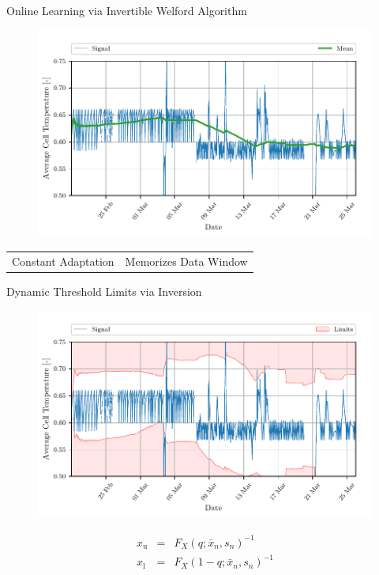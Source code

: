\documentclass[aspectratio=169]{beamer}
\newcommand{\ui}[2]{#1 _{\mathrm{#2}}}
\begin{document}
\begin{frame}{Online Learning via Invertible Welford Algorithm}
    \begin{figure}
        \begin{center}
            \includegraphics[width=0.62\linewidth]{../ilustrate/pc2023/bess/rmean_signal.pdf}
        \end{center}
    \end{figure}

    \centering
    \begin{tabular}{c|c}
        {\color{green}{$+$}} Constant Adaptation & {\color{red}{$-$}} Memorizes Data Window \\
    \end{tabular}
\end{frame}

\begin{frame}{Dynamic Threshold Limits via Inversion}
    \begin{figure}
        \begin{center}
            \includegraphics[width=0.62\linewidth]{../ilustrate/pc2023/bess/thresh_unsupervised_thresh.pdf}
        \end{center}
    \end{figure}
    \begin{eqnarray}
        \ui{x}{u}&=&F_{X}(q; \bar x_n, s_n)^{-1}\nonumber \\
        \ui{x}{l}&=&F_{X}(1 - q; \bar x_n, s_n)^{-1}\nonumber
    \end{eqnarray}
    
\end{frame}
\end{document}
